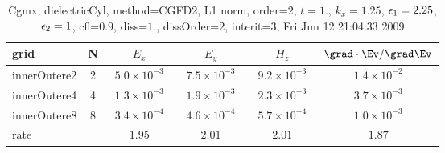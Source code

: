 \begin{table}[hbt]\tableFont %
\begin{center}
\begin{tabular}{|l|c|c|c|c|c|} \hline 
grid  & N &  $E_x$ &  $E_y$ & $H_z$ & $\grad\cdot\Ev/\grad\Ev$\\ \hline 
        innerOutere2 &     2 & ~$5.0\times10^{ -3}$~ & ~$7.5\times10^{ -3}$~ & ~$9.2\times10^{ -3}$~ & ~$1.4\times10^{ -2}$~  \\ \hline
        innerOutere4 &     4 & ~$1.3\times10^{ -3}$~ & ~$1.9\times10^{ -3}$~ & ~$2.3\times10^{ -3}$~ & ~$3.7\times10^{ -3}$~  \\ \hline
        innerOutere8 &     8 & ~$3.4\times10^{ -4}$~ & ~$4.6\times10^{ -4}$~ & ~$5.7\times10^{ -4}$~ & ~$1.0\times10^{ -3}$~  \\ \hline
    rate             &       &       $1.95$          &       $2.01$          &       $2.01$          &       $1.87$           \\ \hline
\end{tabular}
\caption{Cgmx, dielectricCyl, method=CGFD2, L1 norm, order=$2$, $t=1.$, $k_x=1.25$, $\epsilon_1=2.25$, $\epsilon_2=1$, cfl=$0.9$, diss=$1.$, dissOrder=$2$, interit=$3$, Fri Jun 12 21:04:33 2009}\label{table:dielectricCylNFDTDOrder2L1}
\end{center}
\end{table}
